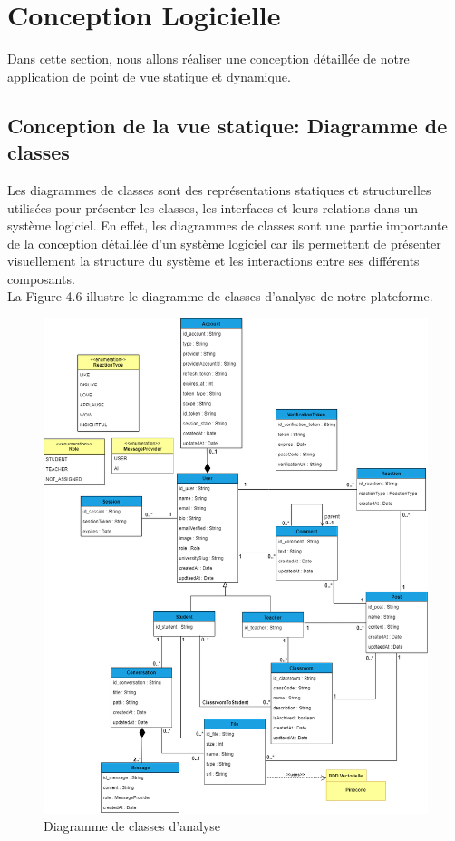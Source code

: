 \section{Conception Logicielle}
Dans cette section, nous allons réaliser une conception détaillée de notre application de point de vue statique et dynamique.

\subsection{Conception de la vue statique: Diagramme de classes}
Les diagrammes de classes sont des représentations statiques et structurelles utilisées pour présenter les classes, les interfaces et leurs relations dans un système logiciel. En effet, les diagrammes de classes sont une partie importante de la conception détaillée d'un système logiciel car ils permettent de présenter visuellement la structure du système et les interactions entre ses différents composants.\\
La Figure 4.6 illustre le diagramme de classes d’analyse de notre plateforme.

\begin{figure}[H]
    \centering
    \includegraphics[width=1.1\textwidth,height=1.32\textwidth]{images/chp4/fig6.png}
    \caption{Diagramme de classes d'analyse}
    \label{fig:Diagramme de classes d'analyse}    
\end{figure}

